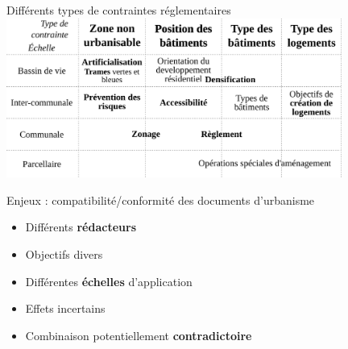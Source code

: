\documentclass[xcolor=table]{beamer}
\begin{document}
\begin{frame}{Différents types de contraintes réglementaires} 
	\includegraphics[width=11cm]{Images/synthese-doc.png}
\end{frame}

\begin{frame}{Enjeux : compatibilité/conformité des documents d'urbanisme}
	\begin{itemize}
		\item Différents \textbf{rédacteurs}
		\item Objectifs divers
		\item Différentes \textbf{échelles} d'application
		\item Effets incertains 
		\item Combinaison potentiellement \textbf{contradictoire}
	\end{itemize}
\end{frame}
\end{document}
